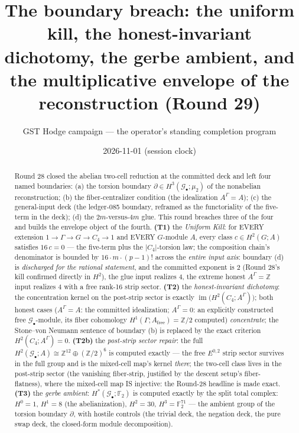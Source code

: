\documentclass[11pt]{article}
\title{The boundary breach: the uniform kill, the honest-invariant dichotomy,
the gerbe ambient, and the multiplicative envelope of the reconstruction
(Round 29)}
\author{GST Hodge campaign --- the operator's standing completion program}
\date{2026-11-01 (session clock)}
\newcommand{\GammaL}{\Gamma}
\newcommand{\Cfour}{C_4}
\newcommand{\Gbul}{\mathcal{G}_\bullet}
\newcommand{\im}{\operatorname{im}}
\newcommand{\Z}{\mathbb{Z}}
\newcommand{\F}{\mathbb{F}}
\newcommand{\mud}{\mu_2}
\begin{document}
\maketitle

\begin{abstract}
Round 28 closed the abelian two-cell reduction at the committed deck and
left four named boundaries: (a) the torsion boundary $\partial\in
H^3(\Gbul;\mud)$ of the nonabelian reconstruction; (b) the
fiber-centralizer condition (the idealization $A^\GammaL=A$); (c) the
general-input deck (the ledger-085 boundary, reframed as the
functoriality of the five-term in the deck); (d) the $2m$-versus-$4m$
glue. This round breaches three of the four and builds the envelope
object of the fourth. \textbf{(T1)} the \emph{Uniform Kill}: for EVERY
extension $1\to\GammaL\to G\to\Cfour\to 1$ and EVERY $G$-module $A$,
every class $c\in H^2(G;A)$ satisfies $16\,c=0$ --- the five-term plus
the $|\Cfour|$-torsion law; the composition chain's denominator is
bounded by $16\cdot m\cdot(p-1)!$ across the \emph{entire input axis}:
boundary (d) is \emph{discharged for the rational statement}, and the
committed exponent is $2$ (Round 28's kill confirmed directly in
$H^2$), the glue input realizes $4$, the extreme honest
$A^\GammaL=\Z$ input realizes $4$ with a free rank-16 strip sector.
\textbf{(T2)} the \emph{honest-invariant dichotomy}: the concentration
kernel on the post-strip sector is exactly
$\im\bigl(H^2(\Cfour;A^\GammaL)\bigr)$; both honest cases
($A^\GammaL=A$: the committed idealization; $A^\GammaL=0$: an explicitly
constructed free $\Gbul$-module, its fiber cohomology
$H^1(\GammaL;A_{\mathrm{free}})=\Z/2$ computed) \emph{concentrate}; the
Stone--von Neumann sentence of boundary (b) is replaced by the exact
criterion $H^2(\Cfour;A^\GammaL)=0$. \textbf{(T2b)} the
\emph{post-strip sector repair}: the full
$H^2(\Gbul;A)\cong\Z^{12}\oplus(\Z/2)^6$ is computed exactly --- the
free $E^{0,2}$ strip sector survives in the full group and is the
mixed-cell map's kernel \emph{there}; the two-cell class lives in the
post-strip sector (the vanishing fiber-strip, justified by the descent
setup's fiber-flatness), where the mixed-cell map IS injective: the
Round-28 headline is made exact. \textbf{(T3)} the \emph{gerbe
ambient}: $H^*(\Gbul;\F_2)$ is computed exactly by the split total
complex: $H^0=1$, $H^1=8$ (the abelianization), $H^2=30$,
$H^3=\F_2^{71}$ --- the ambient group of the torsion boundary
$\partial$, with hostile controls (the trivial deck, the negation deck,
the pure swap deck, the closed-form module decomposition).

\end{abstract}
\end{document}
